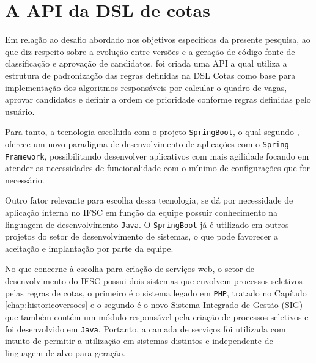 \section{A API da DSL de cotas}
\label{apicotas}

Em relação ao desafio abordado nos objetivos específicos da presente pesquisa, ao que diz respeito sobre a evolução entre versões e a geração de código fonte de classificação e aprovação de candidatos, foi criada uma \gls{API} a qual utiliza a estrutura de padronização das regras definidas na DSL Cotas como base para implementação dos algoritmos responsáveis por calcular o quadro de vagas, aprovar candidatos e definir a ordem de prioridade conforme regras definidas pelo usuário.


Para tanto, a tecnologia escolhida com o projeto \texttt{SpringBoot}, o qual segundo , oferece um novo paradigma de desenvolvimento de aplicações com o \texttt{Spring Framework}, possibilitando desenvolver aplicativos com mais agilidade focando em atender as necessidades de funcionalidade com o mínimo de configurações que for necessário.

Outro fator relevante para escolha dessa tecnologia, se dá por necessidade de aplicação interna no \gls{IFSC} em função da equipe possuir conhecimento na linguagem de desenvolvimento \texttt{Java}. O \texttt{SpringBoot} já é utilizado em outros projetos do setor de desenvolvimento de sistemas, o que pode favorecer a aceitação e implantação por parte da equipe.

No que concerne à escolha para criação de serviços web, o setor de desenvolvimento do \gls{IFSC} possui dois sistemas que envolvem processos seletivos pelas regras de cotas, o primeiro é o sistema legado em \texttt{PHP}, tratado no Capítulo \ref{chap:historicoversoes} e o segundo é o novo Sistema Integrado de Gestão (SIG) que também contém um módulo responsável pela criação de processos seletivos e foi desenvolvido em \texttt{Java}. Portanto, a camada de serviços foi utilizada com intuito de permitir a utilização em sistemas distintos e independente de linguagem de alvo para geração.




